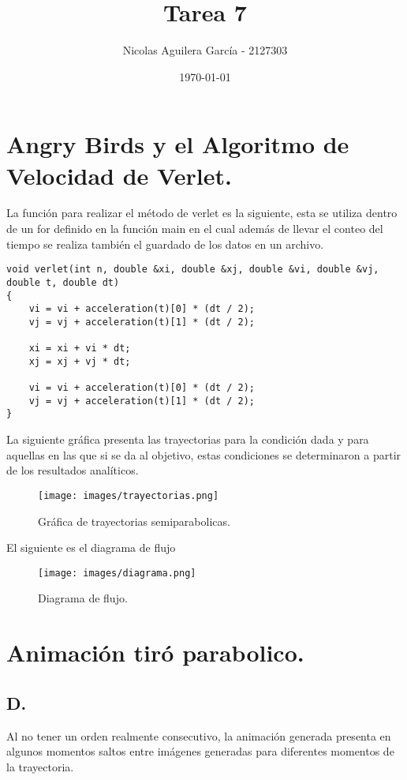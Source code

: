 \documentclass[10pt]{article}
\title{Tarea 7}
\author{Nicolas Aguilera García - 2127303}
\date{\today}
\begin{document}
    \maketitle

    \section{Angry Birds y el Algoritmo de Velocidad de Verlet.}
    La función para realizar el método de verlet es la siguiente, esta se utiliza dentro de un for definido en la función main en el cual además de llevar el conteo del tiempo se realiza también el guardado de los datos en un archivo.
    
    \begin{verbatim}
void verlet(int n, double &xi, double &xj, double &vi, double &vj, double t, double dt)
{
    vi = vi + acceleration(t)[0] * (dt / 2);
    vj = vj + acceleration(t)[1] * (dt / 2);

    xi = xi + vi * dt;
    xj = xj + vj * dt;

    vi = vi + acceleration(t)[0] * (dt / 2);
    vj = vj + acceleration(t)[1] * (dt / 2);
}
    \end{verbatim}

    La siguiente gráfica presenta las trayectorias para la condición dada y para aquellas en las que si se da al objetivo, estas condiciones se determinaron a partir de los resultados analíticos.

    \begin{figure}[H]
        \centering
        \texttt{[image: images/trayectorias.png]}
        \caption{Gráfica de trayectorias semiparabolicas.}
        \label{img}
    \end{figure}

    El siguiente es el diagrama de flujo

    \begin{figure}[H]
        \centering
        \texttt{[image: images/diagrama.png]}
        \caption{Diagrama de flujo.}
        \label{img}
    \end{figure}

    \section{Animación tiró parabolico.}
    \subsection*{D.}
    Al no tener un orden realmente consecutivo, la animación generada presenta en algunos momentos saltos entre imágenes generadas para diferentes momentos de la trayectoria.
\end{document}
